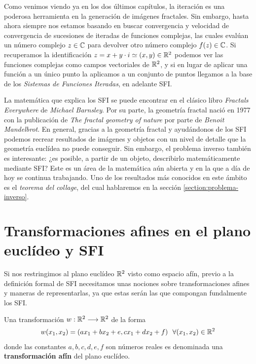 
Como venimos viendo ya en los dos últimos capítulos, la iteración es una poderosa herramienta en la generación de imágenes fractales. Sin embargo, hasta ahora siempre nos estamos basando en buscar convergencia y velocidad de convergencia de sucesiones de iteradas de funciones complejas, las cuales evalúan un número complejo $z\in\mathbb{C}$ para devolver otro número complejo $f(z)\in\mathbb{C}$. Si recuperamos la identificación $z=x+y\cdot i\simeq (x,y)\in\mathbb{R}^2$ podemos ver las funciones complejas como campos vectoriales de $\mathbb{R}^2$, y si en lugar de aplicar una función a un único punto la aplicamos a un conjunto de puntos llegamos a la base de los \textit{Sistemas de Funciones Iteradas}, en adelante SFI. 

La matemática que explica los SFI se puede encontrar en el clásico libro \textit{Fractals Everywhere} \cite{Barnsley} de \textit{Michael Barnsley}. Por su parte, la geometría fractal nació en 1977 con la publicación de \textit{The fractal geometry of nature} \cite{alma991007242979704990} por parte de \textit{Benoit Mandelbrot}. En general, gracias a la geometría fractal y ayudándonos de los SFI podemos recrear resultados de imágenes y objetos con un nivel de detalle que la geometría euclídea no puede conseguir. Sin embargo, el problema inverso también es interesante: ¿es posible, a partir de un objeto, describirlo matemáticamente mediante SFI? Este es un área de la matemática aún abierta y en la que a día de hoy se continua trabajando. Uno de los resultados más conocidos en este ámbito es el \textit{teorema del collage}, del cual hablaremos en la sección \ref{section:problema-inverso}.

\section{Transformaciones afines en el plano euclídeo y SFI}

Si nos restringimos al plano euclídeo $\mathbb{R}^2$ visto como espacio afín, previo a la definición formal de SFI necesitamos unas nociones sobre transformaciones afines y maneras de representarlas, ya que estas serán las que compongan fundalmente los SFI.

\begin{definicion}
    Una transformación $w:\mathbb{R}^2\longrightarrow\mathbb{R}^2$ de la forma
    \begin{equation}
        w(x_1,x_2)=(ax_1+bx_2+e,cx_1+dx_2+f) \ \ \forall (x_1,x_2)\in\mathbb{R}^2
    \end{equation}
    donde las constantes $a,b,c,d,e,f$ son números reales es denominada una \textbf{transformación afín} del plano euclídeo.
\end{definicion}

